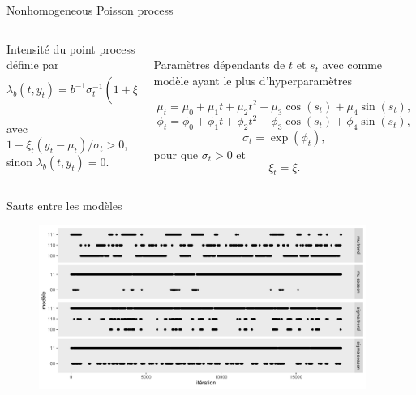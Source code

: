 \documentclass[aspectratio=169]{beamer}
\begin{document}
\begin{frame}{Nonhomogeneous Poisson process}
\begin{columns}
	\begin{column}{0.5\textwidth}
		Intensité du point process définie par
		\vspace{0.1cm} \\
		\begin{equation*}
		\lambda_b(t,y_t) = b^{-1}\sigma_t^{-1} \left( 1+\xi_t\dfrac{y_t-\mu_t}{\sigma_t} \right)^{-1/\xi_t-1}
		\end{equation*}
		\vspace{0.2cm} \\
		avec $1+\xi_t(y_t-\mu_t)/\sigma_t > 0$, \\ sinon $\lambda_b(t,y_t) = 0$.
	\end{column}
	\begin{column}{0.5\textwidth}
	\vspace{0.5cm} \\
		Paramètres dépendants de $t$ et $s_t$ avec comme modèle ayant le plus d'hyperparamètres
		\begin{fleqn}
		\begin{equation*}
		\mu_t = \mu_0 + \mu_1 t + \mu_2 t^2 + \mu_3 \cos(s_t) + \mu_4 \sin(s_t),
		\end{equation*}
		\begin{equation*}
		\phi_t = \phi_0 + \phi_1 t + \phi_2 t^2 + \phi_3 \cos(s_t) + \phi_4 \sin(s_t),
		\end{equation*}
		\begin{equation*}
		\sigma_t = \exp(\phi_t),
		\end{equation*}
		pour que $\sigma_t > 0$ et
		\begin{equation*}
		\xi_t = \xi.
		\end{equation*}
		\end{fleqn}
	\end{column}
\end{columns}
	\vspace{1cm}
	{\scriptsize
	\cite{northrop_threshold_2016}}
\end{frame}



\begin{frame}{Sauts entre les modèles}
	\begin{figure}
	\vspace{-0.15cm}
	 \includegraphics[width=0.95\textwidth, center]{../figures/jumps.pdf}
	\end{figure}
\end{frame}
\end{document}
